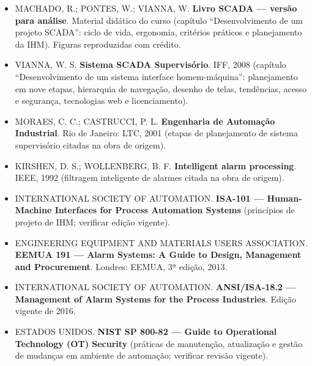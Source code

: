 \begin{itemize}
\tightlist
\item
  MACHADO, R.; PONTES, W.; VIANNA, W. \textbf{Livro SCADA --- versão para análise}. Material didático do curso (capítulo ``Desenvolvimento de um projeto SCADA'': ciclo de vida, ergonomia, critérios práticos e planejamento da IHM). Figuras reproduzidas com crédito.
\item
  VIANNA, W. S. \textbf{Sistema SCADA Supervisório}. IFF, 2008 (capítulo ``Desenvolvimento de um sistema interface homem-máquina'': planejamento em nove etapas, hierarquia de navegação, desenho de telas, tendências, acesso e segurança, tecnologias web e licenciamento).
\item
  MORAES, C. C.; CASTRUCCI, P. L. \textbf{Engenharia de Automação Industrial}. Rio de Janeiro: LTC, 2001 (etapas de planejamento de sistema supervisório citadas na obra de origem).
\item
  KIRSHEN, D. S.; WOLLENBERG, B. F. \textbf{Intelligent alarm processing}. IEEE, 1992 (filtragem inteligente de alarmes citada na obra de origem).
\item
  INTERNATIONAL SOCIETY OF AUTOMATION. \textbf{ISA-101 --- Human-Machine Interfaces for Process Automation Systems} (princípios de projeto de IHM; verificar edição vigente).
\item
  ENGINEERING EQUIPMENT AND MATERIALS USERS ASSOCIATION. \textbf{EEMUA 191 --- Alarm Systems: A Guide to Design, Management and Procurement}. Londres: EEMUA, 3ª edição, 2013.
\item
  INTERNATIONAL SOCIETY OF AUTOMATION. \textbf{ANSI/ISA-18.2 --- Management of Alarm Systems for the Process Industries}. Edição vigente de 2016.
\item
  ESTADOS UNIDOS. \textbf{NIST SP 800-82 --- Guide to Operational Technology (OT) Security} (práticas de manutenção, atualização e gestão de mudanças em ambiente de automação; verificar revisão vigente).
\end{itemize}
